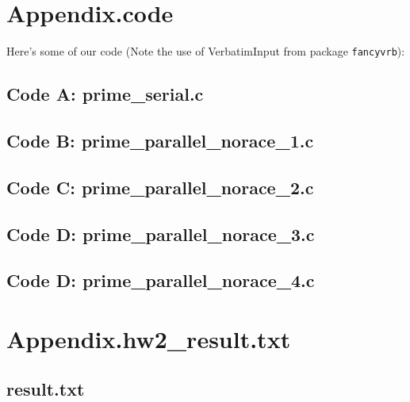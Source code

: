 \documentclass[11pt]{article}
\begin{document}



 


\newpage

\section{Appendix.code}

Here's some of our code (Note the use of VerbatimInput from package \texttt{fancyvrb}):


\subsection{Code A: prime\_serial.c}

\begin{footnotesize}

\end{footnotesize}


\subsection{Code B: prime\_parallel\_norace\_1.c}


\begin{footnotesize}

\end{footnotesize}


\subsection{Code C: prime\_parallel\_norace\_2.c}


\begin{footnotesize}

\end{footnotesize}


\subsection{Code D: prime\_parallel\_norace\_3.c}

\begin{footnotesize}

\end{footnotesize}


\subsection{Code D: prime\_parallel\_norace\_4.c}

\begin{footnotesize}

\end{footnotesize}


\section{Appendix.hw2\_result.txt}

\subsection{result.txt}

\begin{footnotesize}
 
\end{footnotesize}
\end{document}
